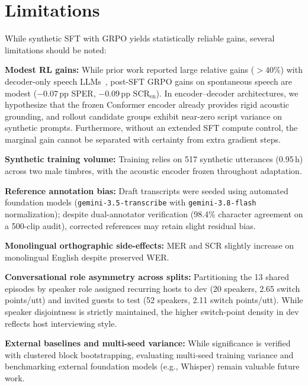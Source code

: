 \documentclass[10pt,twocolumn,a4paper]{article}
\newcommand{\pp}{\,\text{pp}}
\newcommand{\SCRen}{\text{SCR}_{\text{en}}}
\begin{document}
\section{Limitations}
While synthetic SFT with GRPO yields statistically reliable gains, several limitations should be noted:
\begin{enumerate}[nosep,leftmargin=1.2em,topsep=1pt]
  \item \textbf{Modest RL gains:} While prior work reported large relative gains ($>40\%$) with decoder-only speech LLMs~\cite{synthetic_grpo2026}, post-SFT GRPO gains on spontaneous speech are modest ($-0.07\pp$ SPER, $-0.09\pp$ $\SCRen$). In encoder--decoder architectures, we hypothesize that the frozen Conformer encoder already provides rigid acoustic grounding, and rollout candidate groups exhibit near-zero script variance on synthetic prompts. Furthermore, without an extended SFT compute control, the marginal gain cannot be separated with certainty from extra gradient steps.
  \item \textbf{Synthetic training volume:} Training relies on 517 synthetic utterances (0.95\,h) across two male timbres, with the acoustic encoder frozen throughout adaptation.
  {\sloppy \item \textbf{Reference annotation bias:} Draft transcripts were seeded using automated foundation models (\texttt{gemini-3.5-transcribe} with \texttt{gemini-3.8-flash} normalization); despite dual-annotator verification (98.4\% character agreement on a 500-clip audit), corrected references may retain slight residual bias.\par}
  \item \textbf{Monolingual orthographic side-effects:} MER and SCR slightly increase on monolingual English despite preserved WER.
  \item \textbf{Conversational role asymmetry across splits:} Partitioning the 13 shared episodes by speaker role assigned recurring hosts to dev (20 speakers, 2.65 switch points/utt) and invited guests to test (52 speakers, 2.11 switch points/utt). While speaker disjointness is strictly maintained, the higher switch-point density in dev reflects host interviewing style.
  \item \textbf{External baselines and multi-seed variance:} While significance is verified with clustered block bootstrapping, evaluating multi-seed training variance and benchmarking external foundation models (e.g., Whisper) remain valuable future work.
\end{enumerate}
\end{document}
